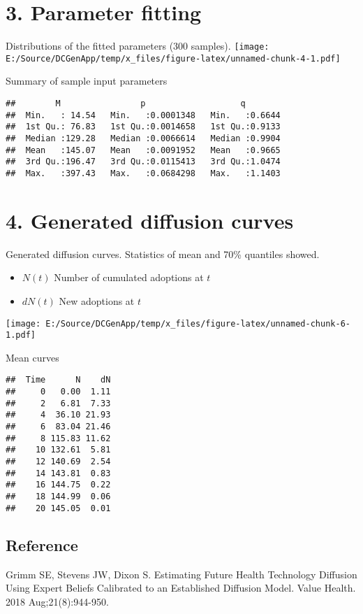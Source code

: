 \documentclass[]{article}
\providecommand{\tightlist}{%
  \setlength{\itemsep}{0pt}\setlength{\parskip}{0pt}}
\begin{document}
\pagebreak

\section{3. Parameter fitting}\label{parameter-fitting}

Distributions of the fitted parameters (300 samples).
\texttt{[image: E:/Source/DCGenApp/temp/x\_files/figure-latex/unnamed-chunk-4-1.pdf]}

Summary of sample input parameters

\begin{verbatim}
##        M                p                   q         
##  Min.   : 14.54   Min.   :0.0001348   Min.   :0.6644  
##  1st Qu.: 76.83   1st Qu.:0.0014658   1st Qu.:0.9133  
##  Median :129.28   Median :0.0066614   Median :0.9904  
##  Mean   :145.07   Mean   :0.0091952   Mean   :0.9665  
##  3rd Qu.:196.47   3rd Qu.:0.0115413   3rd Qu.:1.0474  
##  Max.   :397.43   Max.   :0.0684298   Max.   :1.1403
\end{verbatim}

\pagebreak

\section{4. Generated diffusion
curves}\label{generated-diffusion-curves}

Generated diffusion curves. Statistics of mean and 70\% quantiles
showed.

\begin{itemize}
\tightlist
\item
  \(N(t)\) Number of cumulated adoptions at \(t\)
\item
  \(dN(t)\) New adoptions at \(t\)
\end{itemize}

\texttt{[image: E:/Source/DCGenApp/temp/x\_files/figure-latex/unnamed-chunk-6-1.pdf]}

Mean curves

\begin{verbatim}
##  Time      N    dN
##     0   0.00  1.11
##     2   6.81  7.33
##     4  36.10 21.93
##     6  83.04 21.46
##     8 115.83 11.62
##    10 132.61  5.81
##    12 140.69  2.54
##    14 143.81  0.83
##    16 144.75  0.22
##    18 144.99  0.06
##    20 145.05  0.01
\end{verbatim}

\subsection{Reference}\label{reference}

Grimm SE, Stevens JW, Dixon S. Estimating Future Health Technology
Diffusion Using Expert Beliefs Calibrated to an Established Diffusion
Model. Value Health. 2018 Aug;21(8):944-950.
\end{document}
